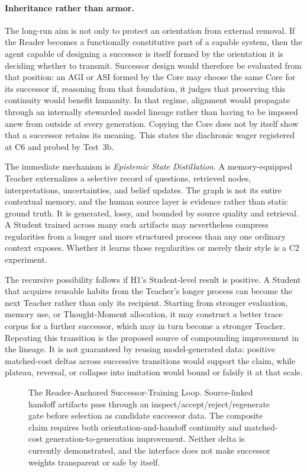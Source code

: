 \documentclass[11pt]{article}
\begin{document}
		\paragraph{Inheritance rather than armor.} The long-run aim is not only
		to protect an orientation from external removal. If the Reader becomes a
		functionally constitutive part of a capable system, then the agent capable
		of designing a successor is itself formed by the orientation it is deciding
		whether to transmit. Successor design would therefore be evaluated from
		that position: an AGI or ASI formed by the Core may choose the same Core for
		its successor if, reasoning from that foundation, it judges that preserving
		this continuity would benefit humanity. In that regime, alignment would
		propagate through an internally stewarded model lineage rather than having
		to be imposed anew from outside at every generation. Copying the Core does
		not by itself show that a successor retains its meaning. This states the
		diachronic wager registered at C6 and probed by Test~3b.

		The immediate mechanism is \emph{Epistemic State Distillation}. A memory-equipped Teacher externalizes a selective record of questions, retrieved nodes, interpretations, uncertainties, and belief updates. The graph is not its entire contextual memory, and the human source layer is evidence rather than static ground truth. It is generated, lossy, and bounded by source quality and retrieval. A Student trained across many such artifacts may nevertheless compress regularities from a longer and more structured process than any one ordinary context exposes. Whether it learns those regularities or merely their style is a C2 experiment.

		The recursive possibility follows if H1's Student-level result is positive. A Student
		that acquires reusable habits from the Teacher's longer process can become
		the next Teacher rather than only its recipient. Starting from stronger
		evaluation, memory use, or Thought-Moment allocation, it may construct a
		better trace corpus for a further successor, which may in turn become a
		stronger Teacher. Repeating this transition is the proposed source of
		compounding improvement in the lineage. It is not guaranteed by reusing
		model-generated data: positive matched-cost deltas across successive
		transitions would support the claim, while plateau, reversal, or collapse
		into imitation would bound or falsify it at that scale.
	
		\begin{figure}[h]
			\centering
			\resizebox{0.94\textwidth}{!}{}
				\caption{The Reader-Anchored Successor-Training Loop. Source-linked handoff artifacts pass through an inspect/accept/reject/regenerate gate before selection as candidate successor data. The composite claim requires both orientation-and-handoff continuity and matched-cost generation-to-generation improvement. Neither delta is currently demonstrated, and the interface does not make successor weights transparent or safe by itself.}
				\label{fig:self-improvement}
			\end{figure}
			\FloatBarrier
\end{document}
